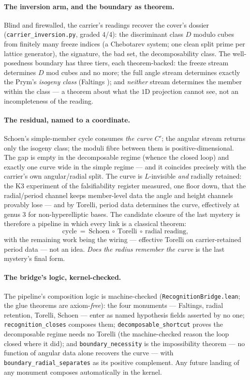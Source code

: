 \documentclass[11pt]{article}
\theoremstyle{definition}
\theoremstyle{remark}
\begin{document}
\paragraph{The inversion arm, and the boundary as theorem.} Blind and
firewalled, the carrier's readings recover the cover's dossier
(\texttt{carrier\_inversion.py}, graded 4/4): the discriminant class $D$
modulo cubes from finitely many freeze indices (a Chebotarev system; one
clean split prime per lattice generator), the signature, the bad set, the
decomposability class. The well-posedness boundary has three tiers, each
theorem-backed: the freeze stream determines $D$ mod cubes and no more;
the full angle stream determines exactly the Prym's \emph{isogeny class}
(Faltings \cite{Faltings}); and \emph{neither} stream determines the member
within the class --- a theorem about what the $1$D projection cannot see,
not an incompleteness of the reading.

\paragraph{The residual, named to a coordinate.} Schoen's simple-member
cycle consumes \emph{the curve} $C'$; the angular stream returns only the
isogeny class; the moduli fibre between them is positive-dimensional. The
gap is empty in the decomposable regime (whence the closed loop) and
exactly one curve wide in the simple regime --- and it coincides precisely
with the carrier's own angular/radial split. The curve is $L$-invisible
\emph{and} radially retained: the K3 experiment of the falsifiability
register measured, one floor down, that the radial/period channel keeps
member-level data the angle and height channels provably lose --- and by
Torelli, period data determines the curve, effectively at genus 3 for
non-hyperelliptic bases. The candidate closure of the last mystery is
therefore a pipeline in which every link is a classical theorem:
\[
  \text{cycle}\ =\ \text{Schoen}\ \circ\ \text{Torelli}\ \circ\
  \text{radial reading},
\]
with the remaining work being the wiring --- effective Torelli on
carrier-retained period data --- not an idea. \emph{Does the radius
remember the curve} is the last mystery's final form.

\paragraph{The bridge's logic, kernel-checked.} The pipeline's composition
logic is machine-checked (\texttt{RecognitionBridge.lean}; the glue
theorems are axiom-\emph{free}): the four monuments --- Faltings, radial
retention, Torelli, Schoen --- enter as named hypothesis fields asserted by
no one; \texttt{recognition\_closes} composes them;
\texttt{decomposable\_shortcut} proves the decomposable regime needs no
Torelli (the machine-checked reason the loop closed where it did); and
\texttt{boundary\_necessity} is the impossibility theorem --- no function
of angular data alone recovers the curve --- with
\texttt{boundary\_radial\_separates} as its positive complement. Any future
landing of any monument composes automatically in the kernel.
\end{document}
